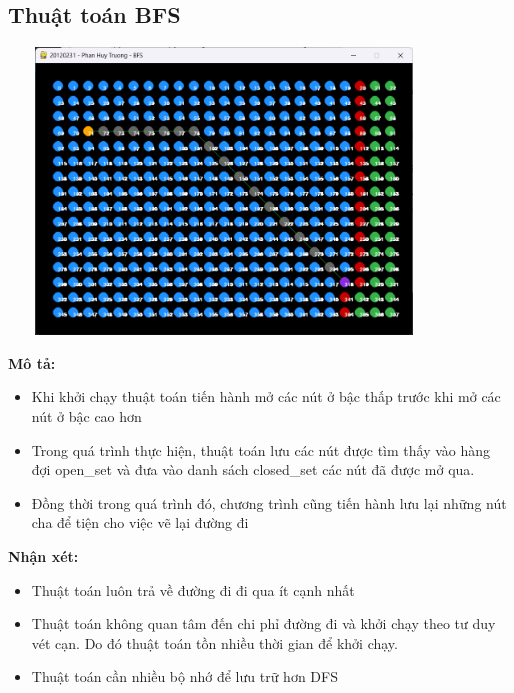 \documentclass{article}
\begin{document}
\subsection{Thuật toán BFS}
    \centerline{\includegraphics[width=4.5in, height=3in]{image/bfs_stimulation.png}}
    \vspace{2\baselineskip}
    \textbf{Mô tả: }
    \begin{itemize}
        \item Khi khởi chạy thuật toán tiến hành mở các nút ở bậc thấp trước khi mở các nút ở bậc cao hơn
        \item Trong quá trình thực hiện, thuật toán lưu các nút được tìm thấy vào hàng đợi open\_set và đưa vào danh sách closed\_set các nút đã được mở qua.
        \item Đồng thời trong quá trình đó, chương trình cũng tiến hành lưu lại những nút cha để tiện cho việc vẽ lại đường đi
    \end{itemize}
    \textbf{Nhận xét: }
    \begin{itemize}
        \item Thuật toán luôn trả về đường đi đi qua ít cạnh nhất 
        \item Thuật toán không quan tâm đến chi phỉ đường đi và khởi chạy theo tư duy vét cạn. Do đó thuật toán tồn nhiều thời gian để khởi chạy.
        \item Thuật toán cần nhiều bộ nhớ để lưu trữ hơn DFS
    \end{itemize}
    
\end{document}
